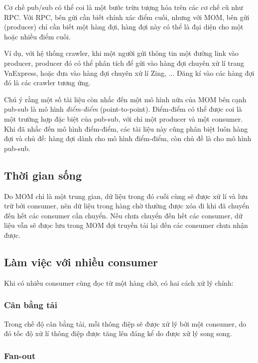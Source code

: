 \documentclass{article}
\begin{document}
Cơ chế pub/sub có thể coi là một bước trừu tượng hóa trên các cơ chế cũ như RPC.
Với RPC, bên gửi cần biết chính xác điểm cuối, nhưng với MOM, bên gửi (producer)
chỉ cần biết một hàng đợi, hàng đợi này có thể là đại diện cho một hoặc nhiều
điểm cuối.

Ví dụ, với hệ thống crawler, khi một người gửi thông tin một đường link vào
producer, producer đó có thể phân tích để gửi vào hàng đợi chuyên xử lí trang
VnExpress, hoặc đưa vào hàng đợi chuyên xử lí Zing, ... Đăng kí vào các hàng đợi
đó là các crawler tương ứng.

Chú ý rằng một số tài liệu còn nhắc đến một mô hình nữa của MOM bên cạnh pub-sub
là mô hình \emph{điểm-điểm} (point-to-point). Điểm-điểm có thể được coi là một
trường hợp đặc biệt của pub-sub, với chỉ một producer và một consumer. Khi đã
nhắc đến mô hình điểm-điểm, các tài liệu này cũng phân biệt luôn hàng đợi và chủ
đề: hàng đợi dành cho mô hình điểm-điểm, còn chủ đề là cho mô hình pub-sub.

\subsection{Thời gian sống}

Do MOM chỉ là một trung gian, dữ liệu trong đó cuối cùng sẽ được xử lí và lưu
trữ bởi consumer, nên dữ liệu trong hàng chờ thường được xóa đi khi đã chuyển
đến hết các consumer cần chuyển. Nếu chưa chuyển đến hết các consumer, dữ liệu
vẫn sẽ đưọc lưu trong MOM đợi truyền tải lại đến các consumer chưa nhận được.

\subsection{Làm việc với nhiều consumer}

Khi có nhiều consumer cùng đọc từ một hàng chờ, có hai cách xử lý chính:

\subsubsection{Cân bằng tải}

Trong chế độ cân bằng tải, mỗi thông điệp sẽ được xử lý bởi một consumer, do đó
tốc độ xử lí thông điệp được tăng lên đáng kể do được xử lý song song.

\subsubsection{Fan-out}
\end{document}
